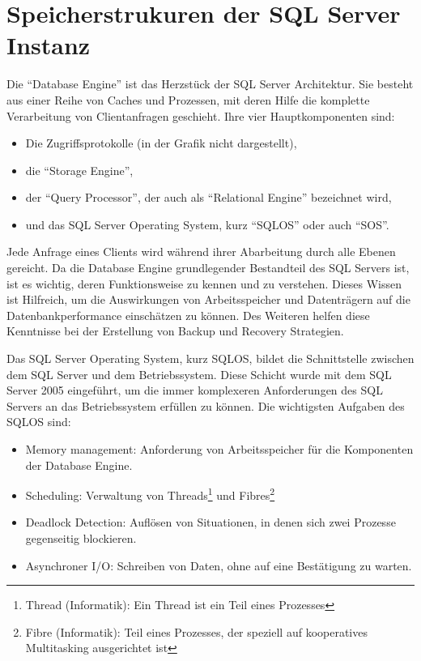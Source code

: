     \section{Speicherstrukuren der SQL Server Instanz}
      Die \enquote{Database Engine} ist das Herzstück der SQL Server
      Architektur. Sie besteht aus einer Reihe von Caches und Prozessen, mit
      deren Hilfe die komplette Verarbeitung von Clientanfragen geschieht. Ihre
      vier Hauptkomponenten sind:
      \begin{itemize}
        \item Die Zugriffsprotokolle (in der Grafik nicht dargestellt),
        \item die \enquote{Storage Engine},
        \item der \enquote{Query Processor}, der auch als \enquote{Relational
        Engine} bezeichnet wird,
        \item und das SQL Server Operating System, kurz
        \enquote{SQLOS} oder auch \enquote{SOS}.
      \end{itemize}
      Jede Anfrage eines Clients wird während ihrer Abarbeitung durch alle
      Ebenen gereicht. Da die Database Engine grundlegender Bestandteil des
      SQL Servers ist, ist es wichtig, deren Funktionsweise zu kennen und zu
      verstehen. Dieses Wissen ist Hilfreich, um die Auswirkungen von
      Arbeitsspeicher und Datenträgern auf die Datenbankperformance
      einschätzen zu können. Des Weiteren helfen diese Kenntnisse bei der
      Erstellung von Backup und Recovery Strategien.
      
      Das SQL Server Operating System, kurz SQLOS, bildet die Schnittstelle
      zwischen dem SQL Server und dem Betriebssystem. Diese Schicht wurde mit
      dem SQL Server 2005 eingeführt, um die immer komplexeren Anforderungen
      des SQL Servers an das Betriebssystem erfüllen zu können. Die
      wichtigsten Aufgaben des SQLOS sind:
\clearpage
      \begin{itemize}
        \item Memory management: Anforderung von Arbeitsspeicher für die
        Komponenten der Database Engine.
        \item Scheduling: Verwaltung von Threads\footnote{Thread (Informatik):
        Ein Thread ist ein Teil eines Prozesses} und Fibres\footnote{Fibre
        (Informatik): Teil eines Prozesses, der speziell auf kooperatives
        Multitasking ausgerichtet ist}
        \item Deadlock Detection: Auflösen von Situationen, in denen sich zwei
        Prozesse gegenseitig blockieren.
        \item Asynchroner I/O: Schreiben von Daten, ohne auf eine Bestätigung
        zu warten.
      \end{itemize}
